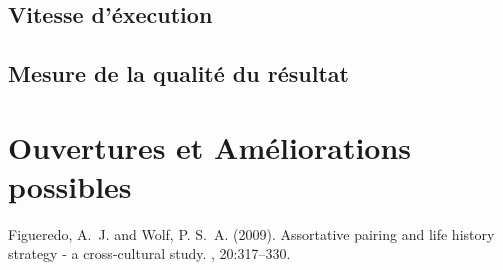 \documentclass[twoside]{article}
\begin{document}
\begin{multicols}{2}
\subsection{Vitesse d'éxecution}

\subsection{Mesure de la qualité du résultat}


\section{Ouvertures et Améliorations possibles}


\begin{thebibliography}{99} %

Figueredo, A.~J. and Wolf, P. S.~A. (2009).
\newblock Assortative pairing and life history strategy - a cross-cultural
  study.
, 20:317--330.
 
\end{thebibliography}


\end{multicols}
\end{document}
